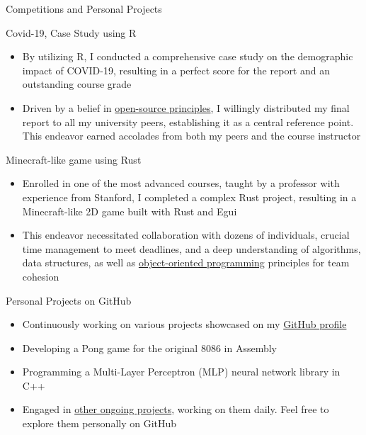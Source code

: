 \documentclass{article}
\newlength{\tabin}
\newlength{\secsep}
\newcommand{\lineunder}{\vspace*{-8pt} \\ \hspace*{-6pt} \hrulefill \\ \vspace*{-15pt}}
\newenvironment{tabbedsection}[1]{
  \begin{list}{}{
      \setlength{\itemsep}{0pt}
      \setlength{\labelsep}{0pt}
      \setlength{\labelwidth}{0pt}
      \setlength{\leftmargin}{\tabin}
      \setlength{\rightmargin}{\tabin}
      \setlength{\listparindent}{0pt}
      \setlength{\parsep}{0pt}
      \setlength{\parskip}{0pt}
      \setlength{\partopsep}{0pt}
      \setlength{\topsep}{#1}
    }
  \item[]
}{\end{list}}
\newenvironment{resume_section}[1]{
  \filbreak
  \vspace{2\secsep}
  \textsc{\large#1}
  \lineunder
  \begin{tabbedsection}{\secsep}
}{\end{tabbedsection}}
\newenvironment{resume_subsection}[2][]{
  \textbf{#2} \hfill {\footnotesize #1} \hspace{2em}
  \begin{tabbedsection}{0.5\secsep}
}{\end{tabbedsection}}
\newenvironment{subitems}{
  \renewcommand{\labelitemi}{$\bullet$} %
  \begin{itemize}
      \setlength{\labelsep}{1em}
}{\end{itemize}}
\begin{document}
\begin{resume_section}{Competitions and Personal Projects}

  \begin{resume_subsection}{Covid-19, Case Study using R}
    \begin{subitems}
      \item By utilizing R, I conducted a comprehensive case study on the demographic impact of COVID-19, resulting in a perfect score for the report and an outstanding course grade
      \item Driven by a belief in \underline{open-source principles}, I willingly distributed my final report to all my university peers, establishing it as a central reference point. This endeavor earned accolades from both my peers and the course instructor
    \end{subitems}
  \end{resume_subsection}

  \begin{resume_subsection}{Minecraft-like game using Rust}
    \begin{subitems}
      \item Enrolled in one of the most advanced courses, taught by a professor with experience from Stanford, I completed a complex Rust project, resulting in a Minecraft-like 2D game built with Rust and Egui
      \item This endeavor necessitated collaboration with dozens of individuals, crucial time management to meet deadlines, and a deep understanding of algorithms, data structures, as well as \underline{object-oriented programming} principles for team cohesion
    \end{subitems}
  \end{resume_subsection}

  \begin{resume_subsection}[]{Personal Projects on GitHub}
    \begin{subitems}
      \item Continuously working on various projects showcased on my \href{https://github.com/gioele-bernardini}{GitHub profile}
      \item Developing a Pong game for the original 8086 in Assembly
      \item Programming a Multi-Layer Perceptron (MLP) neural network library in C++
      \item Engaged in \underline{other ongoing projects}, working on them daily. Feel free to explore them personally on GitHub
    \end{subitems}
  \end{resume_subsection}

\end{resume_section}
\end{document}
